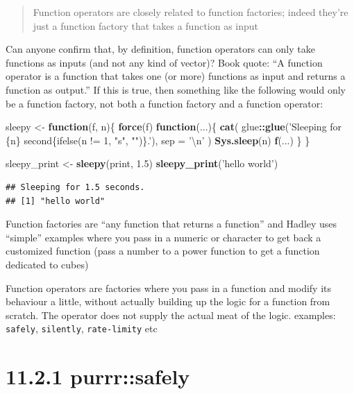 \documentclass[]{book}
\newenvironment{Shaded}{\begin{snugshade}}{\end{snugshade}}
\newcommand{\CharTok}[1]{\textcolor[rgb]{0.31,0.60,0.02}{#1}}
\newcommand{\ControlFlowTok}[1]{\textcolor[rgb]{0.13,0.29,0.53}{\textbf{#1}}}
\newcommand{\DataTypeTok}[1]{\textcolor[rgb]{0.13,0.29,0.53}{#1}}
\newcommand{\FloatTok}[1]{\textcolor[rgb]{0.00,0.00,0.81}{#1}}
\newcommand{\KeywordTok}[1]{\textcolor[rgb]{0.13,0.29,0.53}{\textbf{#1}}}
\newcommand{\NormalTok}[1]{#1}
\newcommand{\OperatorTok}[1]{\textcolor[rgb]{0.81,0.36,0.00}{\textbf{#1}}}
\newcommand{\StringTok}[1]{\textcolor[rgb]{0.31,0.60,0.02}{#1}}
\begin{document}
\begin{quote}
Function operators are closely related to function factories; indeed they're just a function factory that takes a function as input
\end{quote}

Can anyone confirm that, by definition, function operators can only take functions as inputs (and not any kind of vector)? Book quote: ``A function operator is a function that takes one (or more) functions as input and returns a function as output.'' If this is true, then something like the following would only be a function factory, not both a function factory and a function operator:

\begin{Shaded}
\begin{Highlighting}[]
\NormalTok{sleepy <-}\StringTok{ }\ControlFlowTok{function}\NormalTok{(f, n)\{}
  \KeywordTok{force}\NormalTok{(f)}
  \ControlFlowTok{function}\NormalTok{(...)\{}
    \KeywordTok{cat}\NormalTok{(}
\NormalTok{      glue}\OperatorTok{::}\KeywordTok{glue}\NormalTok{(}\StringTok{'Sleeping for \{n\} second\{ifelse(n != 1, "s", "")\}.'}\NormalTok{), }
      \DataTypeTok{sep =} \StringTok{'}\CharTok{\textbackslash{}n}\StringTok{'}
\NormalTok{    )}
    \KeywordTok{Sys.sleep}\NormalTok{(n)}
    \KeywordTok{f}\NormalTok{(...)}
\NormalTok{  \}}
\NormalTok{\}}

\NormalTok{sleepy_print <-}\StringTok{ }\KeywordTok{sleepy}\NormalTok{(print, }\FloatTok{1.5}\NormalTok{)}
\KeywordTok{sleepy_print}\NormalTok{(}\StringTok{'hello world'}\NormalTok{)}
\end{Highlighting}
\end{Shaded}

\begin{verbatim}
## Sleeping for 1.5 seconds.
## [1] "hello world"
\end{verbatim}

Function factories are ``any function that returns a function'' and Hadley uses ``simple'' examples where you pass in a numeric or character to get back a customized function (pass a number to a power function to get a function dedicated to cubes)

Function operators are factories where you pass in a function and modify its behaviour a little, without actually building up the logic for a function from scratch. The operator does not supply the actual meat of the logic.
examples: \texttt{safely}, \texttt{silently}, \texttt{rate-limity} etc

\hypertarget{purrrsafely}{%
\section*{11.2.1 purrr::safely}\label{purrrsafely}}
\end{document}
